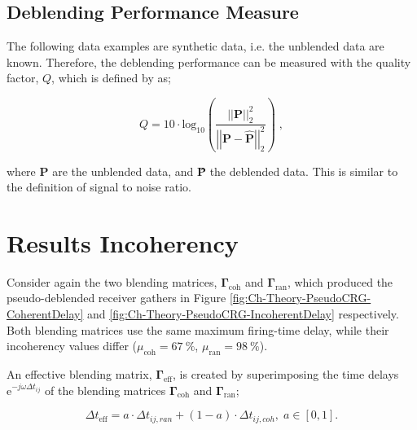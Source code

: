 \subsection*{Deblending Performance Measure}

The following data examples are synthetic data, i.e. the unblended data are known. Therefore, the deblending performance can be measured with the quality factor, $Q$, which is defined by \citet{IbrahimQuality} as;

\begin{equation}
	Q = 10 \cdot \mathrm{log_{10}} \left( \frac{\left|\left|\mathbf{P}\right|\right| _2 ^2}{\left|\left|\mathbf{P - \hat{P}}\right|\right| _2 ^2} \right) \;,	
\end{equation}

where $\mathbf{P}$ are the unblended data, and \textbf{\^{P}} the deblended data. This is similar to the definition of signal to noise ratio. 





\section{Results Incoherency}

Consider again the two blending matrices, $\mathbf{\Gamma}_{\mathrm{coh}}$ and $\mathbf{\Gamma}_{\mathrm{ran}}$, which produced the pseudo-deblended receiver gathers in Figure \ref{fig:Ch-Theory-PseudoCRG-CoherentDelay} and \ref{fig:Ch-Theory-PseudoCRG-IncoherentDelay} respectively. Both blending matrices use the same maximum firing-time delay, while their incoherency values differ ($\mu_{\mathrm{coh}} = \SI{67}{\percent}$, $\mu_{\mathrm{ran}} = \SI{98}{\percent}$). 

An effective blending matrix, $\mathbf{\Gamma}_{\mathrm{eff}}$, is created by superimposing the time delays $\mathrm{e}^{-j \omega \Delta t_{ij}}$ of the blending matrices $\mathbf{\Gamma}_{\mathrm{coh}}$ and $\mathbf{\Gamma}_{\mathrm{ran}}$;

\begin{equation}
	\Delta t_{\mathrm{eff}} = a \cdot \Delta t_{ij,ran} + (1 - a) \cdot \Delta t_{ij,coh}, \; a \in [0,1].
	\label{eq:Ch-Incoherency-EffectiveG}
\end{equation}


